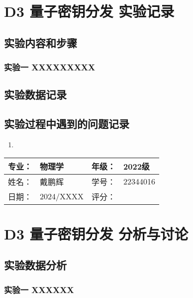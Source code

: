 \documentclass[dvipsnames, svgnames,a4paper,11pt]{article}
\begin{document}
\section{D3 \quad 量子密钥分发 \quad\heiti 实验记录}
\subsection{实验内容和步骤}

	\subsubsection{实验一 \quad XXXXXXXXX}
	
		



\subsection{实验数据记录}










\subsection{实验过程中遇到的问题记录}

\begin{enumerate}
	\item 
	
\end{enumerate}
	

\clearpage
\begin{table}
	\renewcommand\arraystretch{1.7}
	\begin{tabularx}{\textwidth}{|X|X|X|X|}
	\hline
	专业：& 物理学 &年级：& 2022级\\
	\hline
	姓名： & 戴鹏辉 & 学号：& 22344016\\
	\hline
    日期：& 2024/XXXX & 评分： &\\
	\hline
	\end{tabularx}
\end{table}

\section{D3 \quad 量子密钥分发 \quad\heiti 分析与讨论}

\subsection{实验数据分析}


	\subsubsection{实验一 XXXXXX}
		
		
\end{document}
